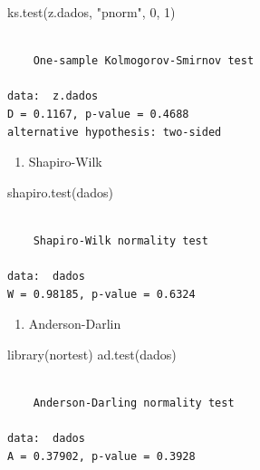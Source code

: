 \documentclass[
  letterpaper,
  DIV=11,
  numbers=noendperiod]{scrartcl}
\newenvironment{Shaded}{\begin{snugshade}}{\end{snugshade}}
\newcommand{\DecValTok}[1]{\textcolor[rgb]{0.68,0.00,0.00}{#1}}
\newcommand{\FunctionTok}[1]{\textcolor[rgb]{0.28,0.35,0.67}{#1}}
\newcommand{\NormalTok}[1]{\textcolor[rgb]{0.00,0.23,0.31}{#1}}
\newcommand{\StringTok}[1]{\textcolor[rgb]{0.13,0.47,0.30}{#1}}
\providecommand{\tightlist}{%
  \setlength{\itemsep}{0pt}\setlength{\parskip}{0pt}}\usepackage{longtable,booktabs,array}
\begin{document}
\begin{Shaded}
\begin{Highlighting}[]
\FunctionTok{ks.test}\NormalTok{(z.dados, }\StringTok{"pnorm"}\NormalTok{, }\DecValTok{0}\NormalTok{, }\DecValTok{1}\NormalTok{)}
\end{Highlighting}
\end{Shaded}

\begin{verbatim}

    One-sample Kolmogorov-Smirnov test

data:  z.dados
D = 0.1167, p-value = 0.4688
alternative hypothesis: two-sided
\end{verbatim}

\begin{enumerate}
\def\labelenumi{\roman{enumi})}
\setcounter{enumi}{1}
\tightlist
\item
  Shapiro-Wilk
\end{enumerate}

\begin{Shaded}
\begin{Highlighting}[]
\FunctionTok{shapiro.test}\NormalTok{(dados)}
\end{Highlighting}
\end{Shaded}

\begin{verbatim}

    Shapiro-Wilk normality test

data:  dados
W = 0.98185, p-value = 0.6324
\end{verbatim}

\begin{enumerate}
\def\labelenumi{\roman{enumi})}
\setcounter{enumi}{2}
\tightlist
\item
  Anderson-Darlin
\end{enumerate}

\begin{Shaded}
\begin{Highlighting}[]
\FunctionTok{library}\NormalTok{(nortest)}
\FunctionTok{ad.test}\NormalTok{(dados)}
\end{Highlighting}
\end{Shaded}

\begin{verbatim}

    Anderson-Darling normality test

data:  dados
A = 0.37902, p-value = 0.3928
\end{verbatim}
\end{document}
